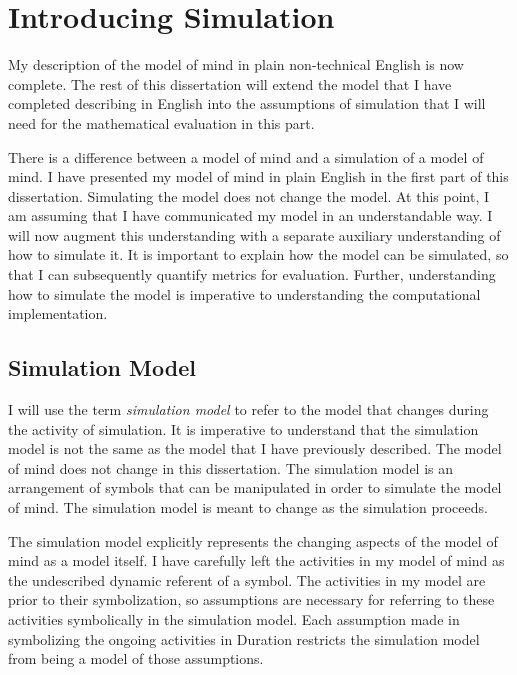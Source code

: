 \chapter{Introducing Simulation}
\label{chapter:introducing_simulation}

My description of the model of mind in plain non-technical English is
now complete.  The rest of this dissertation will extend the model
that I have completed describing in English into the assumptions of
simulation that I will need for the mathematical evaluation in this
part.

There is a difference between a model of mind and a simulation of a
model of mind.  I have presented my model of mind in plain English in
the first part of this dissertation.  Simulating the model does not
change the model.  At this point, I am assuming that I have
communicated my model in an understandable way.  I will now augment
this understanding with a separate auxiliary understanding of how to
simulate it.  It is important to explain how the model can be
simulated, so that I can subsequently quantify metrics for evaluation.
Further, understanding how to simulate the model is imperative to
understanding the computational implementation.

\section{Simulation Model}

I will use the term \emph{simulation model} to refer to the model that
changes during the activity of simulation.  It is imperative to
understand that the simulation model is not the same as the model that
I have previously described.  The model of mind does not change in
this dissertation.  The simulation model is an arrangement of symbols
that can be manipulated in order to simulate the model of mind.  The
simulation model is meant to change as the simulation proceeds.

The simulation model explicitly represents the changing aspects of the
model of mind as a model itself.  I have carefully left the activities
in my model of mind as the undescribed dynamic referent of a symbol.
The activities in my model are prior to their symbolization, so
assumptions are necessary for referring to these activities
symbolically in the simulation model.  Each assumption made in
symbolizing the ongoing activities in Duration restricts the
simulation model from being a model of those assumptions.


